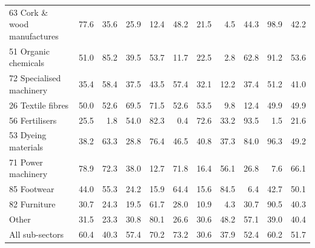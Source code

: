 \begin{tabular}{lrrrrrrrrrr}
63 Cork \& wood manufactures & 77.6 & 35.6 & 25.9 & 12.4 & 48.2 & 21.5 & 4.5 & 44.3 & 98.9 & 42.2 \\
51 Organic chemicals & 51.0 & 85.2 & 39.5 & 53.7 & 11.7 & 22.5 & 2.8 & 62.8 & 91.2 & 53.6 \\
72 Specialised machinery & 35.4 & 58.4 & 37.5 & 43.5 & 57.4 & 32.1 & 12.2 & 37.4 & 51.2 & 41.0 \\
26 Textile fibres & 50.0 & 52.6 & 69.5 & 71.5 & 52.6 & 53.5 & 9.8 & 12.4 & 49.9 & 49.9 \\
56 Fertilisers & 25.5 & 1.8 & 54.0 & 82.3 & 0.4 & 72.6 & 33.2 & 93.5 & 1.5 & 21.6 \\
53 Dyeing materials & 38.2 & 63.3 & 28.8 & 76.4 & 46.5 & 40.8 & 37.3 & 84.0 & 96.3 & 49.2 \\
71 Power machinery & 78.9 & 72.3 & 38.0 & 12.7 & 71.8 & 16.4 & 56.1 & 26.8 & 7.6 & 66.1 \\
85 Footwear & 44.0 & 55.3 & 24.2 & 15.9 & 64.4 & 15.6 & 84.5 & 6.4 & 42.7 & 50.1 \\
82 Furniture & 30.7 & 24.3 & 19.5 & 61.7 & 28.0 & 10.9 & 4.3 & 30.7 & 90.5 & 40.3 \\
Other & 31.5 & 23.3 & 30.8 & 80.1 & 26.6 & 30.6 & 48.2 & 57.1 & 39.0 & 40.4 \\
All sub-sectors & 60.4 & 40.3 & 57.4 & 70.2 & 73.2 & 30.6 & 37.9 & 52.4 & 60.2 & 51.7 \\
\bottomrule
\end{tabular}
